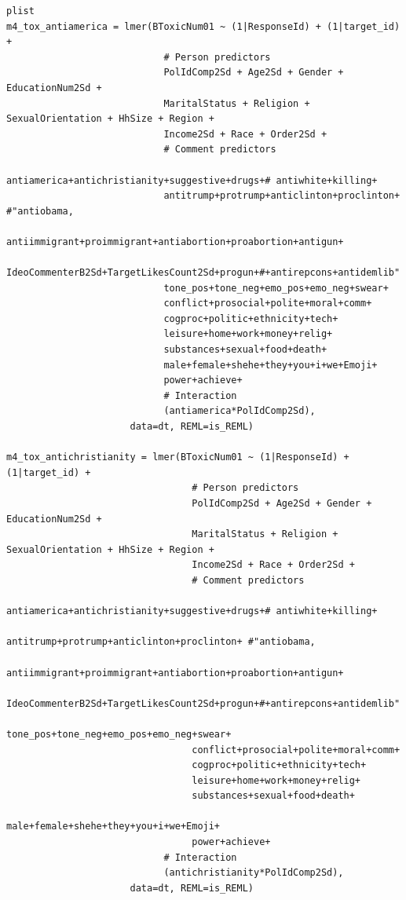 \documentclass{article}
\begin{document}
\begin{lstlisting}
plist
m4_tox_antiamerica = lmer(BToxicNum01 ~ (1|ResponseId) + (1|target_id) + 
                            # Person predictors
                            PolIdComp2Sd + Age2Sd + Gender + EducationNum2Sd + 
                            MaritalStatus + Religion + SexualOrientation + HhSize + Region + 
                            Income2Sd + Race + Order2Sd + 
                            # Comment predictors  
                            antiamerica+antichristianity+suggestive+drugs+# antiwhite+killing+
                            antitrump+protrump+anticlinton+proclinton+ #"antiobama,
                            antiimmigrant+proimmigrant+antiabortion+proabortion+antigun+
                            IdeoCommenterB2Sd+TargetLikesCount2Sd+progun+#+antirepcons+antidemlib"
                            tone_pos+tone_neg+emo_pos+emo_neg+swear+
                            conflict+prosocial+polite+moral+comm+
                            cogproc+politic+ethnicity+tech+
                            leisure+home+work+money+relig+  
                            substances+sexual+food+death+    
                            male+female+shehe+they+you+i+we+Emoji+
                            power+achieve+
                            # Interaction
                            (antiamerica*PolIdComp2Sd),
                      data=dt, REML=is_REML)

m4_tox_antichristianity = lmer(BToxicNum01 ~ (1|ResponseId) + (1|target_id) + 
                                 # Person predictors
                                 PolIdComp2Sd + Age2Sd + Gender + EducationNum2Sd + 
                                 MaritalStatus + Religion + SexualOrientation + HhSize + Region + 
                                 Income2Sd + Race + Order2Sd + 
                                 # Comment predictors  
                                 antiamerica+antichristianity+suggestive+drugs+# antiwhite+killing+
                                 antitrump+protrump+anticlinton+proclinton+ #"antiobama,
                                 antiimmigrant+proimmigrant+antiabortion+proabortion+antigun+
                                 IdeoCommenterB2Sd+TargetLikesCount2Sd+progun+#+antirepcons+antidemlib"
                                 tone_pos+tone_neg+emo_pos+emo_neg+swear+
                                 conflict+prosocial+polite+moral+comm+
                                 cogproc+politic+ethnicity+tech+
                                 leisure+home+work+money+relig+  
                                 substances+sexual+food+death+    
                                 male+female+shehe+they+you+i+we+Emoji+
                                 power+achieve+
                            # Interaction
                            (antichristianity*PolIdComp2Sd),
                      data=dt, REML=is_REML)


\end{lstlisting}
\end{document}
